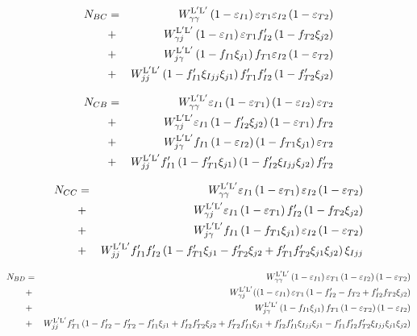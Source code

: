   \begin{eqnarray}
    N_{BC} &=& \WyyLL \left(1- \eIone\right) \eTone \eItwo \left(1- \eTtwo\right) \nonumber \\
    &+& \WyjLL\left(1-\eIone   \right)\eTone \fIptwo  \left(1-\fTtwo \xijtwo  \right)  \nonumber \\
    &+& \WjyLL \left(1-\fIone  \xijone\right) \fTone \eItwo\left(1-\eTtwo   \right)  \nonumber \\
    &+& \WjjLL\left(1-\fIpone\xiIjj\xijone\right) \fTpone \fIptwo \left(1-  \fTptwo\xijtwo\right)
  \end{eqnarray}
  
  \begin{eqnarray}
    N_{CB} &=& \WyyLL \eIone\left(1-  \eTone\right) \left(1- \eItwo\right) \eTtwo  \nonumber \\
    &+& \WyjLL\eIone\left(1-\fIptwo   \xijtwo\right) \left(1-\eTone \right) \fTtwo  \nonumber \\
    &+& \WjyLL \fIone \left(1-\eItwo   \right) \left(1-\fTone \xijone  \right)\eTtwo \nonumber \\
    &+& \WjjLL\fIpone \left(1- \fTpone \xijone\right) \left(1-\fIptwo\xiIjj \xijtwo\right) \fTptwo
  \end{eqnarray}
  
  \begin{eqnarray}
    N_{CC} &=& \WyyLL \eIone \left(1-\eTone\right)\eItwo\left(1-\eTtwo\right) \nonumber \\
    &+& \WyjLL\eIone\left(1-\eTone\right) \fIptwo   \left(1-\fTtwo \xijtwo\right) \nonumber \\
    &+& \WjyLL \fIone  \left(1-\fTone \xijone\right) \eItwo\left(1-\eTtwo\right) \nonumber \\
    &+& \WjjLL\fIpone\fIptwo\left(1-\fTpone\xijone-  \fTptwo\xijtwo+\fTpone \fTptwo\xijone\xijtwo\right)\xiIjj
  \end{eqnarray}
  
  \begin{eqnarray}
    N_{BD} &=& \WyyLL\left(1-\eIone\right)\eTone \left(1-\eItwo\right)\left(1-\eTtwo\right) \nonumber \\
    &+& \WyjLL(\left(1-\eIone  \right)\eTone \left(1 -\fIptwo-\fTtwo + \fIptwo\fTtwo \xijtwo\right) \nonumber \\
    &+& \WjyLL\left(1-\fIone \xijone\right)\fTone  \left(1-\eTtwo \right)\left(1-\eItwo\right)  \\
    &+& \WjjLL\fTpone \left(1-\fIptwo -\fTptwo -\fIpone \xijone+\fIptwo\fTptwo \xijtwo+\fTptwo\fIpone \xijone+\fIptwo\fIpone \xiIjj\xijone-\fIpone\fIptwo\fTptwo \xiIjj\xijone\xijtwo\right) \nonumber
  \end{eqnarray}
  
